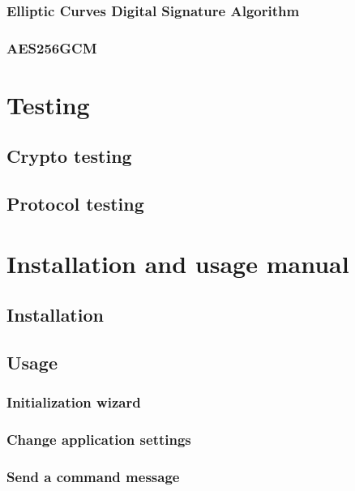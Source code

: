 \documentclass[a4paper,12pt]{article}
\begin{document}
		\subsubsection{Elliptic Curves Digital Signature Algorithm}
		\subsubsection{AES256GCM}
\clearpage

\noindent
\Huge{\section{Testing}}
	\subsection{Crypto testing}
	\subsection{Protocol testing}
\clearpage

\noindent
\Huge{\section{Installation and usage manual}}
	\subsection{Installation}
	\subsection{Usage}
		\subsubsection{Initialization wizard}
		\subsubsection{Change application settings}
		\subsubsection{Send a command message}
\clearpage
\end{document}
